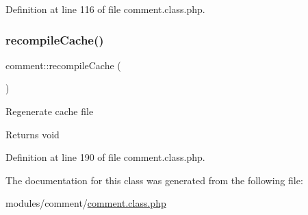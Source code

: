 Definition at line 116 of file comment.\+class.\+php.

\hypertarget{classcomment_a904e04f286e217d550f26a38139107aa}{}\label{classcomment_a904e04f286e217d550f26a38139107aa} 
\subsubsection{\texorpdfstring{recompile\+Cache()}{recompileCache()}}
{\footnotesize\ttfamily comment\+::recompile\+Cache (\begin{DoxyParamCaption}{ }\end{DoxyParamCaption})}

Regenerate cache file \begin{DoxyReturn}{Returns}
void 
\end{DoxyReturn}


Definition at line 190 of file comment.\+class.\+php.



The documentation for this class was generated from the following file\+:\begin{DoxyCompactItemize}
\item 
modules/comment/\hyperlink{comment_8class_8php}{comment.\+class.\+php}\end{DoxyCompactItemize}

